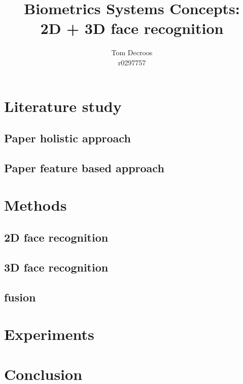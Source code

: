 \documentclass[]{article}
\title{Biometrics Systems Concepts:\\ 2D + 3D face recognition}
\author{Tom Decroos\\r0297757}
\begin{document}
\maketitle
\begin{abstract}
	
\end{abstract}
\section{Literature study}
\subsection{Paper holistic approach}

\subsection{Paper feature based approach}
\section{Methods}
\subsection{2D face recognition}
\subsection{3D face recognition}
\subsection{fusion}
\section{Experiments}
\section{Conclusion}
\printbibliography
\end{document}
